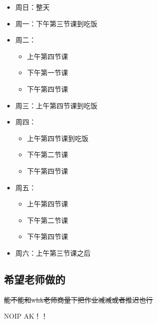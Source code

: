 \documentclass[a4paper, 12pt]{article}
\begin{document}
\begin{itemize}
    \item 周日：整天
    \item 周一：下午第三节课到吃饭
    \item 周二：
    \begin{itemize}
        \item 上午第四节课
        \item 下午第一节课
        \item 下午第四节课
    \end{itemize}
    \item 周三：上午第四节课到吃饭
    \item 周四：
    \begin{itemize}
        \item 上午第四节课到吃饭
        \item 下午第二节课
        \item 下午第四节课
    \end{itemize}
    \item 周五：
    \begin{itemize}
        \item 上午第四节课
        \item 下午第二节课
        \item 下午第四节课
    \end{itemize}
    \item 周六：上午第三节课之后
\end{itemize}

\subsection{希望老师做的}

\sout{能不能和whk老师商量下把作业减减或者推迟也行}

\Huge NOIP AK！！
\end{document}
